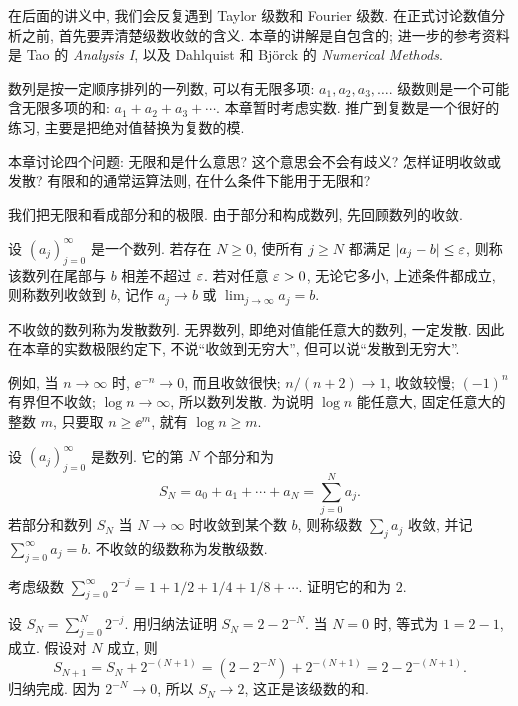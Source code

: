 \label{ch:series}

在后面的讲义中, 我们会反复遇到 Taylor 级数和 Fourier 级数. 在正式讨论数值分析之前, 首先要弄清楚级数收敛的含义. 本章的讲解是自包含的; 进一步的参考资料是 Tao 的 \textit{Analysis I}, 以及 Dahlquist 和 Björck 的 \textit{Numerical Methods}.

数列是按一定顺序排列的一列数, 可以有无限多项: $a_1,a_2,a_3,\ldots$. 级数则是一个可能含无限多项的和: $a_1+a_2+a_3+\cdots$. 本章暂时考虑实数. 推广到复数是一个很好的练习, 主要是把绝对值替换为复数的模.

本章讨论四个问题: 无限和是什么意思? 这个意思会不会有歧义? 怎样证明收敛或发散? 有限和的通常运算法则, 在什么条件下能用于无限和?


我们把无限和看成部分和的极限. 由于部分和构成数列, 先回顾数列的收敛.

\begin{definition}\label{def:sequence-limit}
设 $(a_j)_{j=0}^{\infty}$ 是一个数列. 若存在 $N\geq0$, 使所有 $j\geq N$ 都满足 $|a_j-b|\leq\varepsilon$, 则称该数列在尾部与 $b$ 相差不超过 $\varepsilon$. 若对任意 $\varepsilon>0$, 无论它多小, 上述条件都成立, 则称数列收敛到 $b$, 记作 $a_j\to b$ 或 $\lim_{j\to\infty}a_j=b$.
\end{definition}

不收敛的数列称为发散数列. 无界数列, 即绝对值能任意大的数列, 一定发散. 因此在本章的实数极限约定下, 不说“收敛到无穷大”, 但可以说“发散到无穷大”.

例如, 当 $n\to\infty$ 时, $\ee^{-n}\to0$, 而且收敛很快; $n/(n+2)\to1$, 收敛较慢; $(-1)^n$ 有界但不收敛; $\log n\to\infty$, 所以数列发散. 为说明 $\log n$ 能任意大, 固定任意大的整数 $m$, 只要取 $n\geq\ee^m$, 就有 $\log n\geq m$.

\begin{definition}\label{def:series-limit}
设 $(a_j)_{j=0}^{\infty}$ 是数列. 它的第 $N$ 个部分和为
\[
S_N=a_0+a_1+\cdots+a_N=\sum_{j=0}^{N}a_j.
\]
若部分和数列 $S_N$ 当 $N\to\infty$ 时收敛到某个数 $b$, 则称级数 $\sum_j a_j$ 收敛, 并记 $\sum_{j=0}^{\infty}a_j=b$. 不收敛的级数称为发散级数.
\end{definition}

\begin{example}\label{ex:geometric-half}
考虑级数 $\sum_{j=0}^{\infty}2^{-j}=1+1/2+1/4+1/8+\cdots$. 证明它的和为 $2$.
\end{example}
\begin{solution}
设 $S_N=\sum_{j=0}^{N}2^{-j}$. 用归纳法证明 $S_N=2-2^{-N}$. 当 $N=0$ 时, 等式为 $1=2-1$, 成立. 假设对 $N$ 成立, 则
\[
S_{N+1}=S_N+2^{-(N+1)}=(2-2^{-N})+2^{-(N+1)}=2-2^{-(N+1)}.
\]
归纳完成. 因为 $2^{-N}\to0$, 所以 $S_N\to2$, 这正是该级数的和.
\end{solution}

